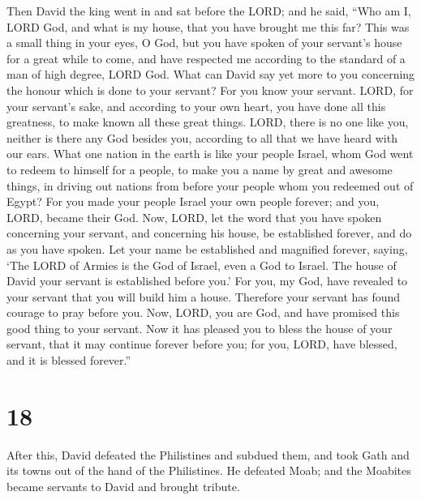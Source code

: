  Then David the king went in and sat before the LORD; and
he said, ``Who am I, LORD God, and what is my house, that you have
brought me this far?  This was a small thing in your
eyes, O God, but you have spoken of your servant's house for a great
while to come, and have respected me according to the standard of a man
of high degree, LORD God.  What can David say yet more to
you concerning the honour which is done to your servant? For you know
your servant.  LORD, for your servant's sake, and
according to your own heart, you have done all this greatness, to make
known all these great things.  LORD, there is no one like
you, neither is there any God besides you, according to all that we have
heard with our ears.  What one nation in the earth is
like your people Israel, whom God went to redeem to himself for a
people, to make you a name by great and awesome things, in driving out
nations from before your people whom you redeemed out of Egypt?
 For you made your people Israel your own people forever;
and you, LORD, became their God.  Now, LORD, let the word
that you have spoken concerning your servant, and concerning his house,
be established forever, and do as you have spoken.  Let
your name be established and magnified forever, saying, `The LORD of
Armies is the God of Israel, even a God to Israel. The house of David
your servant is established before you.'  For you, my
God, have revealed to your servant that you will build him a house.
Therefore your servant has found courage to pray before you.
 Now, LORD, you are God, and have promised this good
thing to your servant.  Now it has pleased you to bless
the house of your servant, that it may continue forever before you; for
you, LORD, have blessed, and it is blessed forever.''

\hypertarget{section-17}{%
\section{18}\label{section-17}}

 After this, David defeated the Philistines and subdued
them, and took Gath and its towns out of the hand of the Philistines.
 He defeated Moab; and the Moabites became servants to
David and brought tribute.

